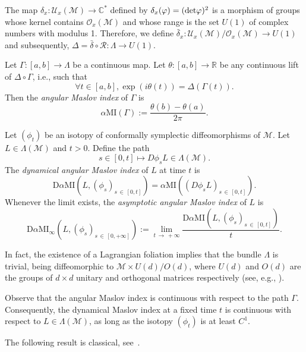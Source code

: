 \documentclass[AHL, Unicode, longabstracts, published]{cedram}
\newcommand*\M{\mathcal{M}}
\newcommand*\cR{\mathcal{R}}
\newcommand*\cU{\mathcal{U}}
\newcommand*\cO{\mathcal{O}}
\newcommand{\MI}{\mathrm{MI}}
\newcommand{\rmD}{\mathrm{D}}
\newcommand*\R{\mathbb{R}}
\newcommand*\C{\mathbb{C}}
\let\oldforall\forall
\renewcommand*{\forall}{\mathrel{\oldforall}}
\begin{document}
The map $\delta_x:\cU_x(\M)\rightarrow \C^*$ defined by $\delta_x (\varphi)=({\rm det} \varphi)^2$ is a morphism of groups whose kernel contains $\cO_x(\M)$ and whose range is the set $U(1)$ of complex numbers with modulus 1. Therefore, we define $\bar\delta_x:\cU_x(\M)/\cO_x(\M)\rightarrow U(1)$ and subsequently, $\Delta=\bar\delta\circ\cR:\Lambda\rightarrow U(1)$.

\begin{defi}
Let $\Gamma:[a, b]\rightarrow \Lambda$ be a continuous map. Let $\theta:[a, b]\rightarrow \R$ be any continuous lift of $\Delta\circ \Gamma$, i.e., such that
\[
\forall t\in [a, b], \exp(i\theta(t))=\Delta(\Gamma(t)).
\]
Then the {\sl angular Maslov index} of $\Gamma$ is
\begin{equation}
\alpha\MI(\Gamma):=\dfrac{\theta(b)-\theta(a)}{2\pi}.
\end{equation}
\end{defi}
\begin{defi}
Let $(\phi_t) $ be an isotopy of conformally symplectic diffeomorphisms of $\M$. Let $L\in\Lambda(\M)$ and $t>0$. Define the path
\[
s\in [0,t]\mapsto D\phi_sL\in\Lambda(\M).
\]
The \emph{dynamical angular Maslov index} of $L$ at time $t$ is
\[
\rmD\alpha\MI\left(L,(\phi_s)_{s\,\in\,[0,t]}\right)=\alpha\MI\left((D\phi_sL)_{s\,\in\,[0, t]}\right).
\]
Whenever the limit exists, the {\sl asymptotic angular Maslov index} of $L$ is
\[
\rmD\alpha\MI_\infty\left(L,(\phi_s)_{s\,\in\,[0,+\infty]}\right):=\lim_{t\,\to\,+\infty}\dfrac{\rmD\alpha\MI(L,(\phi_s)_{s\,\in\,[0,t]})}{t}.
\]
\end{defi}

\begin{rema}
In fact, {the existence of a Lagrangian foliation implies that} the bundle $\Lambda$ is trivial, being diffeomorphic to $\M\times U(d)/O(d)$, where $U(d)$ and $O(d)$ are the groups of $d\times d$ unitary and orthogonal matrices respectively (see, e.g., \cite[Section~1.2]{CGIP}).
\end{rema}


\begin{rema}
Observe that the angular Maslov index is continuous with respect to the path $\Gamma$. Consequently, the dynamical Maslov index at a fixed time $t$ is continuous with respect to $L\in\Lambda(\M)$, as long as the isotopy $(\phi_t)$ is at least $C^1$.
\end{rema}



The following result is classical, see~\cite[Lemma~2.1]{CGIP}.
\end{document}
